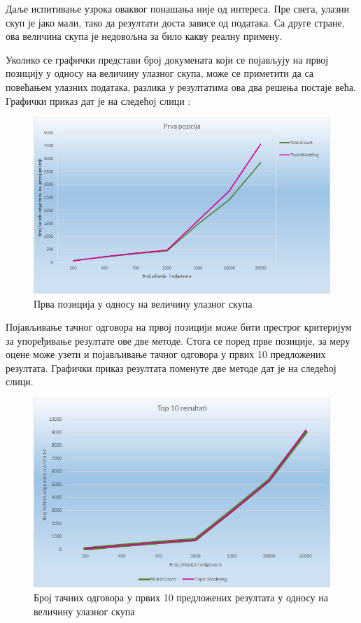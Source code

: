 Даље испитивање узрока оваквог понашања није од интереса. Пре свега, улазни скуп је јако мали, тако да резултати доста зависе од података. Са друге стране, ова величина скупа је недовољна за било какву реалну примену.

Уколико се графички представи број докумената који се појављују на првој позицију у односу на величину улазног скупа, може се приметити да са повећањем улазних података, разлика у резултатима ова два решења постаје већа. Графички приказ дат је на следећој слици :

\begin{figure}[H]
  \centering
   \includegraphics[scale=0.8]{./Slike/prvePoz.png} 
	\caption{Прва позиција у односу на величину улазног скупа}
	\label{fig:slika1}
\end{figure}

Појављивање тачног одговора на првој позицији може бити престрог критеријум за упоређивање резултате ове две методе. Стога се поред прве позиције, за меру оцене може узети и појављивање тачног одговора у првих 10 предложених резултата. Графички приказ резултата поменуте две методе дат је на следећој слици.

\begin{figure}[H]
  \centering
   \includegraphics[scale=0.8]{./Slike/top10.png} 
	\caption{Број тачних одговора у првих 10 предложених резултата у односу на величину улазног скупа}
	\label{fig:slika1}
\end{figure}

